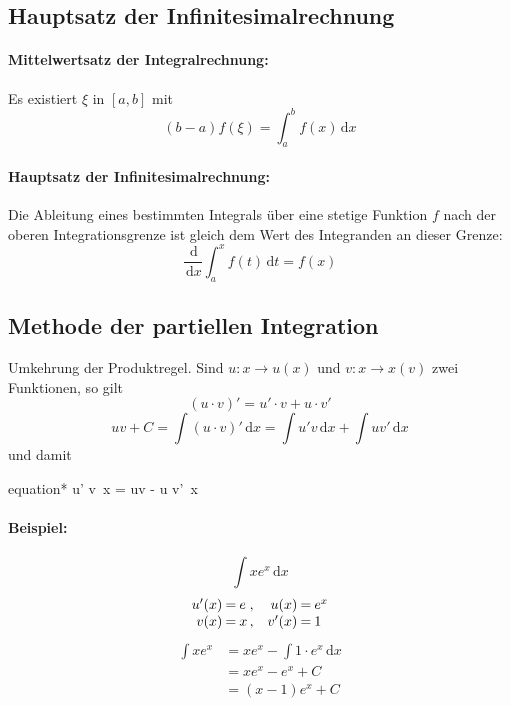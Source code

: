 \documentclass[12pt]{article}
\newcommand{\ud}{\,\mathrm{d}}
\begin{document}
\begin{multicols*}{3}
			\subsection{Hauptsatz der Infinitesimalrechnung} %
			
				\paragraph{Mittelwertsatz der Integralrechnung:}
					Es existiert $\xi$ in $[a,b]$ mit 
					\[
						(b-a)f(\xi) = \int_a^b f(x) \ud x
					\]
				
				\paragraph{Hauptsatz der Infinitesimalrechnung:}
					Die Ableitung eines bestimmten Integrals über eine stetige Funktion $f$
					nach der oberen Integrationsgrenze ist gleich dem Wert des Integranden an
					dieser Grenze:
					\[
						\frac{\ud}{\ud x} \int_a^x f(t) \ud t = f(x)
					\]
			\subsection{Methode der partiellen Integration} %
				Umkehrung der Produktregel. Sind $u : x \to u(x)$ und $v : x \to x(v)$ zwei Funktionen, so gilt
				\[
					(u \cdot v)' = u' \cdot v + u \cdot v'
				\]
				\[
					uv + C = \int (u \cdot v)' \ud x = \int u' v \ud x + \int u v' \ud x
				\]
				und damit
				\begin{empheq}[box=\shadowbox*]{equation*}
						\int u' v \ud x = uv - \int u v' \ud x
				\end{empheq}
				
				\paragraph{Beispiel:}
					\[
						\int x e^x \ud x
					\]
					\[
						\begin{array}{r@{\:=\:}l@{\, , \quad}r@{\:=\:}l}
							u'(x) & e & u(x) & e^x \\
							v(x) & x & v'(x) & 1
						\end{array}
					\]
					\begin{align*}
						\int x e^x &= x e^x - \int 1 \cdot e^x \ud x \\
						&= x e^x - e^x + C \\
						&= (x-1)e^x + C
					\end{align*}
				

\end{multicols*}
\end{document}
